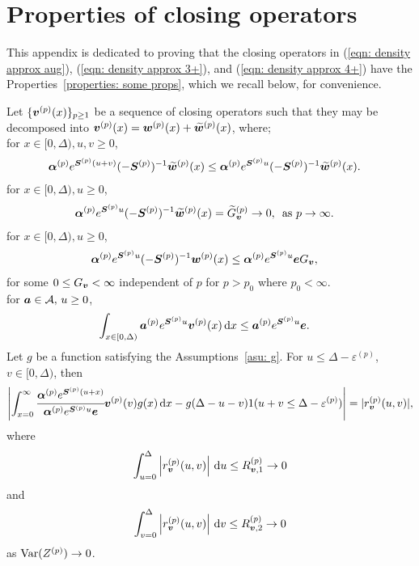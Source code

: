 \chapter{Properties of closing operators}\label{appendix: sec: 2}
This appendix is dedicated to proving that the closing operators in (\ref{eqn: density approx aug}), (\ref{eqn: density approx 3+}), and (\ref{eqn: density approx 4+}) have the Properties~\ref{properties: some props}, which we recall below, for convenience.

\renewcommand{\thedefn}{\arabic{chapter}.\arabic{defn}}
\addtocounter{defn}{1}
\setcounter{chapter}{4}
\begin{property}\label{properties: some props2}
	Let \(\{\boldsymbol v^{(p)}(x)\}_{p\geq 1}\) be a sequence of closing operators such that they may be decomposed into \(\boldsymbol v^{(p)}(x)=\boldsymbol w^{(p)}(x) + \widetilde{\boldsymbol w}^{(p)}(x)\), where; \\
	\subproperty \label{properties: -12} for \(x\in[0,\Delta),u,v\geq 0\),  
        \begin{align*}
        		\boldsymbol \alpha^{(p)} e^{\boldsymbol S^{(p)}(u+v)}(-\boldsymbol S^{(p)})^{-1} \widetilde{\boldsymbol w}^{(p)}(x) &\leq \boldsymbol \alpha^{(p)} e^{\boldsymbol S^{(p)}u}(-\boldsymbol S^{(p)})^{-1} \widetilde{\boldsymbol w}^{(p)}(x).
		\end{align*}
	\subproperty \label{properties: 02} for \(x\in[0,\Delta),u\geq 0\),
		\begin{align*}
			\boldsymbol \alpha^{(p)} e^{\boldsymbol S^{(p)}u}(-\boldsymbol S^{(p)})^{-1} \widetilde{\boldsymbol w}^{(p)}(x) &=\widetilde G_{\boldsymbol v}^{(p)} \to 0,\, \mbox{ as }p \to \infty.  
		\end{align*}
	\subproperty \label{properties: 12} for \(x\in[0,\Delta),u\geq 0\),  
        \begin{align*}
        		\boldsymbol \alpha^{(p)} e^{\boldsymbol S^{(p)}u}(-\boldsymbol S^{(p)})^{-1} \boldsymbol w^{(p)}(x) &\leq \boldsymbol \alpha^{(p)} e^{\boldsymbol S^{(p)}u} \boldsymbol e G_{\boldsymbol v},
	\end{align*}
	for some \(0\leq G_{\boldsymbol v}<\infty\) independent of \(p\) for \(p>p_0\) where \(p_0<\infty\). \\
	\subproperty \label{properties: -22} for \(\boldsymbol a \in\mathcal A,\,u\geq 0\),  
	\begin{align*}
			\int_{x\in[0,\Delta)}\boldsymbol a^{(p)} e^{\boldsymbol S^{(p)}u} {\boldsymbol v}^{(p)}(x) \, \mathrm{d} x&\leq \boldsymbol a^{(p)} e^{\boldsymbol S^{(p)}u} \boldsymbol e.
	\end{align*}
	\subproperty \label{properties: 22} Let \(g\) be a function satisfying the Assumptions~\ref{asu: g}. For \(u\leq \Delta-\varepsilon^{(p)}\), \(v\in[0,\Delta)\), then
	\[\left|\int_{x=0}^\infty \cfrac{\boldsymbol \alpha^{(p)} e^{\boldsymbol{S}^{(p)}(u+x)} }{\boldsymbol \alpha^{(p)} e^{\boldsymbol{S}^{(p)}u} \boldsymbol e} {\boldsymbol v}^{(p)}(v)g(x)\, \mathrm{d} x -g(\Delta-u-v) 1(u+v\leq\Delta-\varepsilon^{(p)})\right| =  |r_{\boldsymbol v}^{(p)}(u,v)|,\]
	where 
	\[ \int_{u=0}^{\Delta}\left| r_{\boldsymbol v}^{(p)}(u,v)\right| \, \mathrm{d} u  \leq R_{{\boldsymbol v},1}^{(p)} \to 0\]
	and 
	\[ \int_{v=0}^{\Delta}\left| r_{\boldsymbol v}^{(p)}(u,v)\right| \, \mathrm{d} v  \leq R_{{\boldsymbol v},2}^{(p)} \to 0\]
	as \(\mathrm{Var}(Z^{(p)})\to 0\). 
\end{property} 
\addtocounter{defn}{-2}
\setcounter{chapter}{2}
\renewcommand{\thedefn}{\Alph{chapter}.\arabic{defn}}

